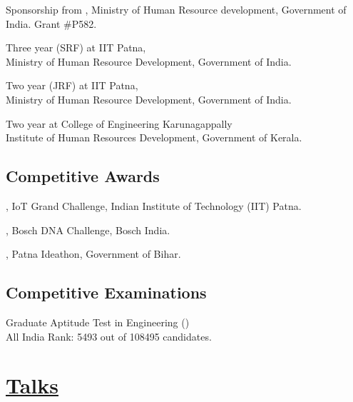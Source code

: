 \documentclass[mm]{simple_style}
\begin{document}
\begin{resume}
Sponsorship from , Ministry of Human Resource development, Government of India. Grant \#P582.  

Three year  (SRF) at IIT Patna, \\
Ministry of Human Resource Development, Government of India. 

Two year  (JRF)  at IIT Patna, \\
Ministry of Human Resource Development, Government of India. 

Two year  at College of Engineering Karunagappally \\
Institute of Human Resources Development, Government of Kerala. 
\halfsectionline
\vspace{-12mm}
\subsection{Competitive Awards}
\vspace{-2ex}

, IoT Grand Challenge, Indian Institute of Technology (IIT) Patna. 

, Bosch DNA Challenge, Bosch India. 

, Patna Ideathon, Government of Bihar. \newpage
\halfsectionline
\vspace{-12mm}
\subsection{Competitive Examinations}
\vspace{-2ex}

Graduate Aptitude Test in Engineering ()  \\ All India Rank: 5493 out of 108495 candidates. 

\vspace{-2ex}
\sectionline
\section{\href{https://alwynm.github.io/talks}{Talks}}


\end{resume}
\end{document}
